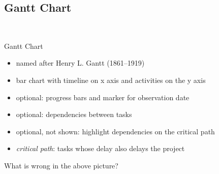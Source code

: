 
\subsection{Gantt Chart}
\begin{frame}{\insertsubsection\ \mytitlesource{\ludewiglichter, \sommerville}}
	\begin{fancycolumns}[widths={40,58}]
		\begin{definition}{Gantt Chart}
			\begin{itemize}
				\item named after Henry L. Gantt (1861--1919)
				\item bar chart with timeline on x axis and activities on the y axis
				\item optional: progress bars and marker for observation date
				\item optional: dependencies between tasks
				\item optional, not shown: highlight dependencies on the critical path
				\item \emph{critical path}: tasks whose delay also delays the project
			\end{itemize}
		\end{definition}
		\nextcolumn
		\begin{exampletight}{}
		\end{exampletight}
		\pause[3]
		\begin{example}{}\centering
			What is wrong in the above picture?
		\end{example}
	\end{fancycolumns}
\end{frame}

